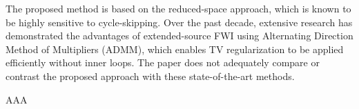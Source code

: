 \begin{point}
	The proposed method is based on the reduced-space approach, which is known to be highly sensitive to cycle-skipping. Over the past decade, extensive research has demonstrated the advantages of extended-source FWI using Alternating Direction Method of Multipliers (ADMM), which enables TV regularization to be applied efficiently without inner loops. The paper does not adequately compare or contrast the proposed approach with these state-of-the-art methods.
\end{point}

\begin{reply}
AAA

\end{reply}
